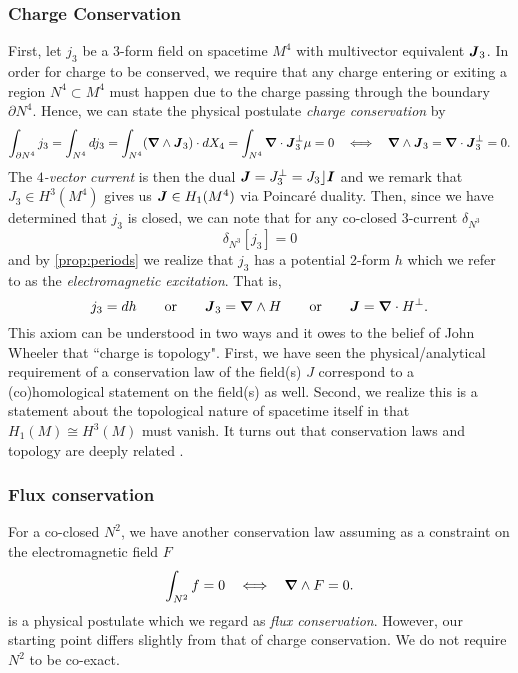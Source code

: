 \documentclass[conf]{new-aiaa}
\begin{document}
\subsubsection{Charge Conservation}
First, let $j_3$ be a 3-form field on spacetime $M^4$ with multivector equivalent $\boldsymbol{J}_3$. In order for charge to be conserved, we require that any charge entering or exiting a region $N^4 \subset M^4$ must happen due to the charge passing through the boundary $\partial N^4$. Hence, we can state the physical postulate \emph{charge conservation} by
\begin{equation}
    \label{eq:topological_charge_conservation}
    \int_{\partial N^4} j_3 = \int_{N^4} dj_3= \int_{N^4} (\boldsymbol{\nabla} \wedge \boldsymbol{J}_3) \cdot dX_4 = \int_{N^4} \boldsymbol{\nabla} \cdot \boldsymbol{J}_3^\perp \mu = 0    ~~\iff~~ \boldsymbol{\nabla} \wedge \boldsymbol{J}_3=\boldsymbol{\nabla} \cdot \boldsymbol{J}_3^\perp = 0.
\end{equation}
The \emph{$4$-vector current} is then the dual $\boldsymbol{J} = J_3^\perp=J_3 \rfloor \boldsymbol{I}$ and we remark that $J_3 \in H^3(M^4)$ gives us $\boldsymbol{J} \in H_1(M^4)$ via Poincar\'e duality. Then, since we have determined that $j_3$ is closed, we can note that for any co-closed $3$-current $\delta_{N^3}$
\begin{equation}
    \delta_{N^3}[j_3] = 0
\end{equation}
and by \cref{prop:periods} we realize that $j_3$ has a potential 2-form $h$ which we refer to as the \emph{electromagnetic excitation}. That is, 
\begin{equation}
\label{eq:current_from_excitation}
    j_3=dh \qquad \textrm{or} \qquad \boldsymbol{J}_3 = \boldsymbol{\nabla} \wedge H \qquad \textrm{or} \qquad \boldsymbol{J} = \boldsymbol{\nabla} \cdot H^\perp.
\end{equation}
This axiom can be understood in two ways and it owes to the belief of John Wheeler that ``charge is topology". First, we have seen the physical/analytical requirement of a conservation law of the field(s) $J$ correspond to a (co)homological statement on the field(s) as well.  Second, we realize this is a statement about the topological nature of spacetime itself in that $H_1(M)\cong H^3(M)$ must vanish. It turns out that conservation laws and topology are deeply related \cite{westenholz_topological_1979}.

\subsubsection{Flux conservation}

For a co-closed $N^2$, we have another conservation law assuming as a constraint on the electromagnetic field $F$
\begin{equation}
    \label{eq:magnetic_flux_conservation}
    \int_{N^2} f = 0  ~~\iff~~ \boldsymbol{\nabla} \wedge F=0.
\end{equation}
is a physical postulate which we regard as \emph{flux conservation}. However, our starting point differs slightly from that of charge conservation. We do not require $N^2$ to be co-exact. 
\end{document}
